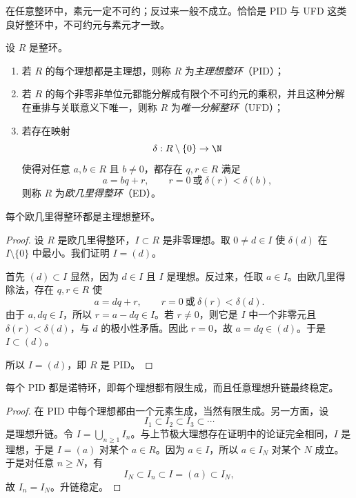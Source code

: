 \begin{remark}
在任意整环中，素元一定不可约；反过来一般不成立。恰恰是 PID 与 UFD 这类良好整环中，不可约元与素元才一致。
\end{remark}

\begin{definition}
设 $R$ 是整环。
\begin{enumerate}[label=\textnormal{(\arabic*)}]
  \item 若 $R$ 的每个理想都是主理想，则称 $R$ 为\emph{主理想整环}（PID）；
  \item 若 $R$ 的每个非零非单位元都能分解成有限个不可约元的乘积，并且这种分解在重排与关联意义下唯一，则称 $R$ 为\emph{唯一分解整环}（UFD）；
  \item 若存在映射
  \[
  \delta:R\setminus\{0\}\to \N
  \]
  使得对任意 $a,b\in R$ 且 $b\neq 0$，都存在 $q,r\in R$ 满足
  \[
  a=bq+r,
  \qquad r=0\ \text{或}\ \delta(r)<\delta(b),
  \]
  则称 $R$ 为\emph{欧几里得整环}（ED）。
\end{enumerate}
\end{definition}

\begin{theorem}
每个欧几里得整环都是主理想整环。
\end{theorem}

\begin{proof}
设 $R$ 是欧几里得整环，$I\subset R$ 是非零理想。取 $0\neq d\in I$ 使 $\delta(d)$ 在 $I\setminus\{0\}$ 中最小。我们证明 $I=(d)$。

首先 $(d)\subset I$ 显然，因为 $d\in I$ 且 $I$ 是理想。反过来，任取 $a\in I$。由欧几里得除法，存在 $q,r\in R$ 使
\[
a=dq+r,
\qquad r=0\ \text{或}\ \delta(r)<\delta(d).
\]
由于 $a,dq\in I$，所以 $r=a-dq\in I$。若 $r\neq 0$，则它是 $I$ 中一个非零元且 $\delta(r)<\delta(d)$，与 $d$ 的极小性矛盾。因此 $r=0$，故 $a=dq\in(d)$。于是 $I\subset(d)$。

所以 $I=(d)$，即 $R$ 是 PID。
\end{proof}

\begin{proposition}
每个 PID 都是诺特环，即每个理想都有限生成，而且任意理想升链最终稳定。
\end{proposition}

\begin{proof}
在 PID 中每个理想都由一个元素生成，当然有限生成。另一方面，设
\[
I_1\subset I_2\subset I_3\subset \cdots
\]
是理想升链。令 $I=\bigcup_{n\ge 1} I_n$。与上节极大理想存在证明中的论证完全相同，$I$ 是理想，于是 $I=(a)$ 对某个 $a\in R$。因为 $a\in I$，所以 $a\in I_N$ 对某个 $N$ 成立。于是对任意 $n\ge N$，有
\[
I_N\subset I_n\subset I=(a)\subset I_N,
\]
故 $I_n=I_N$。升链稳定。
\end{proof}

